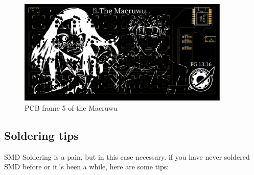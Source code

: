 \documentclass[english, 12pt]{scrartcl}
\begin{document}
	\begin{figure}[H]
		\centering
		\includegraphics[width=0.9\textwidth]{Macruwu PCB_5}
		\caption{PCB frame 5 of the Macruwu}
	\end{figure}
	
	\subsection{Soldering tips}
	SMD Soldering is a pain, but in this case necessary. if you have never soldered SMD before or it´s been a while, here are some tips:
\end{document}
